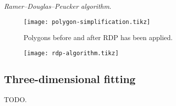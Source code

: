 \textit{Ramer–Douglas–Peucker algorithm}.

\begin{figure}[H]
  \centering
  \texttt{[image: polygon-simplification.tikz]}
  \caption{Polygons before and after RDP has been applied.}
\end{figure}

\begin{figure}[p]
  \centering
  \texttt{[image: rdp-algorithm.tikz]}
  \label{}
\end{figure}

\subsection{Three-dimensional fitting}

TODO.
